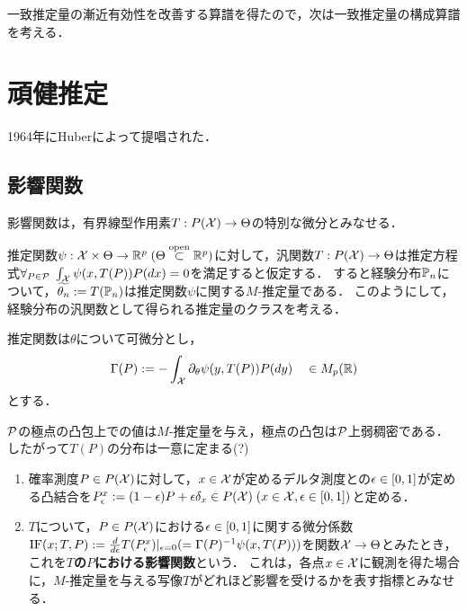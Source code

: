 \documentclass[uplatex,dvipdfmx]{jsreport}
\begin{document}
\begin{tcolorbox}[colframe=ForestGreen, colback=ForestGreen!10!white,breakable,colbacktitle=ForestGreen!40!white,coltitle=black,fonttitle=\bfseries\sffamily,
title=]
    一致推定量の漸近有効性を改善する算譜を得たので，次は一致推定量の構成算譜を考える．
\end{tcolorbox}

\section{頑健推定}

\begin{tcolorbox}[colframe=ForestGreen, colback=ForestGreen!10!white,breakable,colbacktitle=ForestGreen!40!white,coltitle=black,fonttitle=\bfseries\sffamily,
title=]
    1964年にHuberによって提唱された．
\end{tcolorbox}

\subsection{影響関数}

\begin{tcolorbox}[colframe=ForestGreen, colback=ForestGreen!10!white,breakable,colbacktitle=ForestGreen!40!white,coltitle=black,fonttitle=\bfseries\sffamily,
title=]
    影響関数は，有界線型作用素$T:P(\X)\to\Theta$の特別な微分とみなせる．
\end{tcolorbox}

\begin{notation}
    推定関数$\psi:\X\times\Theta\to\R^p\;(\Theta\osub\R^p)$に対して，汎関数$T:P(\X)\to\Theta$は推定方程式$\forall_{P\in\P}\;\int_\X\psi(x,T(P))P(dx)=0$を満足すると仮定する．
    すると経験分布$\bP_n$について，$\wt{\theta_n}:=T(\bP_n)$は推定関数$\psi$に関する$M$-推定量である．
    このようにして，経験分布の汎関数として得られる推定量のクラスを考える．

    推定関数は$\theta$について可微分とし，
    \[\Gamma(P):=-\int_\X\partial_\theta\psi(y,T(P))P(dy)\quad\in M_p(\R)\]
    とする．
\end{notation}
\begin{remark}
    $\P$の極点の凸包上での値は$M$-推定量を与え，極点の凸包は$\P$上弱稠密である．
    したがって$T(P)$の分布は一意に定まる(?)
\end{remark}

\begin{definition}\mbox{}
    \begin{enumerate}
        \item 確率測度$P\in P(\X)$に対して，$x\in\X$が定めるデルタ測度との$\ep\in[0,1]$が定める凸結合を$P^x_\ep:=(1-\ep)P+\ep\delta_x\in P(\X)\;(x\in\X,\ep\in[0,1])$と定める．
        \item $T$について，$P\in P(\X)$における$\ep\in[0,1]$に関する微分係数$\IF(x;T,P):=\dd{}{\ep}T(P^x_\ep)|_{\ep=0}(=\Gamma(P)^{-1}\psi(x,T(P)))$を関数$\X\to\Theta$とみたとき，これを\textbf{$T$の$P$における影響関数}という．
        これは，各点$x\in\X$に観測を得た場合に，$M$-推定量を与える写像$T$がどれほど影響を受けるかを表す指標とみなせる．
    \end{enumerate}
\end{definition}
\end{document}
